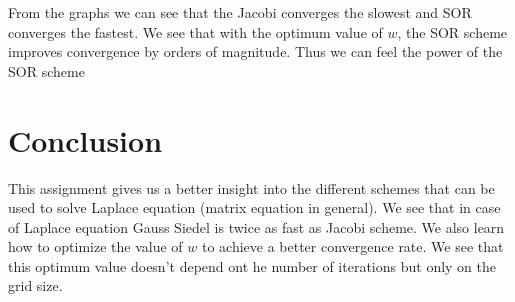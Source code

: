 \documentclass[11pt, a4paper]{article}
\begin{document}
From the graphs we can see that the Jacobi converges the slowest and SOR converges the fastest. We see that with the optimum value
of $w$, the SOR scheme improves convergence by orders of magnitude. Thus we can feel the power of the SOR scheme


\section{Conclusion}

This assignment gives us a better insight into the different schemes that can be used to solve Laplace equation (matrix equation
in general). We see that in case of Laplace equation Gauss Siedel is twice as fast as Jacobi scheme. We also learn how to
optimize the value of $w$ to achieve a better convergence rate. We see that this optimum value doesn't depend ont he number of 
iterations but only on the grid size. 
\end{document}
